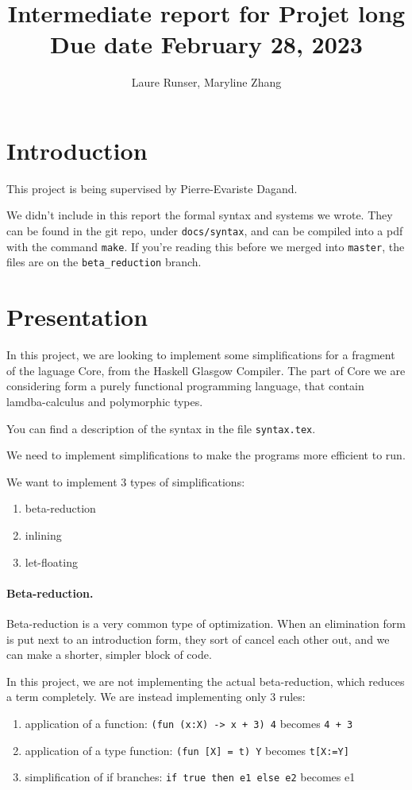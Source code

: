 \documentclass{article}
\title{Intermediate report for Projet long\\ Due date February 28, 2023}
\author{Laure Runser, Maryline Zhang}
\begin{document}
\maketitle


\section{Introduction}
This project is being supervised by Pierre-Evariste Dagand.


We didn't include in this report the formal syntax and systems we wrote.
They can be found in the git repo, under {\tt docs/syntax}, and
can be compiled into a pdf with the command {\tt make}.
If you're reading this before we merged into {\tt master}, the files are on the 
{\tt beta\_reduction} branch.


\section{Presentation}
In this project, we are looking to implement some simplifications for a fragment of 
the laguage Core, from the Haskell Glasgow Compiler. The part of Core we are 
considering form a purely functional programming language, that contain 
lamdba-calculus and polymorphic types.

You can find a description of the syntax in the file {\tt syntax.tex}.

We need to implement simplifications to make the programs more efficient to run.

We want to implement 3 types of simplifications:
\begin{enumerate}
  \item beta-reduction 
  \item inlining 
  \item let-floating
\end{enumerate}

\paragraph{Beta-reduction.}Beta-reduction is a very common type of optimization.
When an elimination form is put next to an introduction form, they sort of cancel 
each other out, and we can make a shorter, simpler block of code.

In this project, we are not implementing the actual beta-reduction, which reduces a
term completely. We are instead implementing only 3 rules:
\begin{enumerate}
  \item application of a function: {\tt (fun (x:X) -> x + 3) 4} becomes {\tt 4 + 3}
  \item application of a type function: {\tt (fun [X] = t) Y} becomes {\tt t[X:=Y]}
  \item simplification of if branches: {\tt if true then e1 else e2} becomes {e1}
\end{enumerate}
\end{document}
